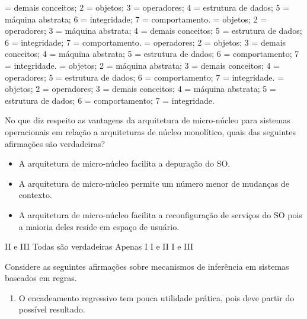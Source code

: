 \documentclass[12pt, addpoints]{exam}
\begin{document}
\begin{questions}
\begin{choices}
 = demais conceitos; 2 = objetos; 3 = operadores; 4 = estrutura de dados; 5 = máquina abstrata; 6 = integridade; 7 = comportamento.
 = objetos; 2 = operadores; 3 = máquina abstrata; 4 = demais conceitos; 5 = estrutura de dados; 6 = integridade; 7 = comportamento.
 = operadores; 2 = objetos; 3 = demais conceitos; 4 = máquina abstrata; 5 = estrutura de dados; 6 = comportamento; 7 = integridade.
 = objetos; 2 = máquina abstrata; 3 = demais conceitos; 4 = operadores; 5 = estrutura de dados; 6 = comportamento; 7 = integridade.
 = objetos; 2 = operadores; 3 = demais conceitos; 4 = máquina abstrata; 5 = estrutura de dados; 6 = comportamento; 7 = integridade.
\end{choices}

\question

No que diz respeito as vantagens da arquitetura de micro-núcleo para sistemas operacionais em relação a arquiteturas de núcleo monolítico, quais das seguintes afirmações são verdadeiras?



\begin{itemize}

    \item[I] A arquitetura de micro-núcleo facilita a depuração do SO.

    \item[II] A arquitetura de micro-núcleo permite um número menor de mudanças de contexto.

    \item[III] A arquitetura de micro-núcleo facilita a reconfiguração de serviços do SO pois a maioria deles reside em espaço de usuário.

\end{itemize}
\begin{choices}
\choice II e III
\choice Todas são verdadeiras
\choice Apenas I
\choice I e II
\choice I e III
\end{choices}

\question

Considere as seguintes afirmações sobre mecanismos de inferência em sistemas baseados em regras.

\begin{enumerate}[label=\Roman*.]

    \item O encadeamento regressivo tem pouca utilidade prática, pois deve partir do possível resultado.


\end{enumerate}
\end{questions}
\end{document}
